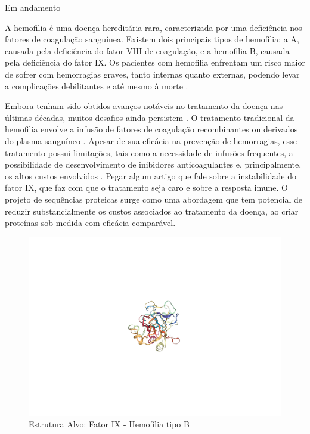 

{\color{red} Em andamento}


\label{cap:introducao}
\enlargethispage{.5\baselineskip}
A hemofilia é uma doença hereditária rara, caracterizada por uma deficiência nos fatores de coagulação sanguínea. Existem dois principais tipos de hemofilia: a A, causada pela deficiência do fator VIII de coagulação, e a hemofilia B, causada pela deficiência do fator IX. 
Os pacientes com hemofilia enfrentam um risco maior de sofrer com hemorragias graves, tanto internas quanto externas, 
podendo levar a complicações debilitantes e até mesmo à morte \cite{Mannucci}.

Embora tenham sido obtidos avanços notáveis no tratamento da doença nas últimas décadas, muitos desafios ainda persistem \cite{Gouw}. 
O tratamento tradicional da hemofilia envolve a infusão de fatores de coagulação recombinantes ou derivados do plasma sanguíneo \cite{Gouw}. Apesar de sua eficácia na prevenção de hemorragias, esse tratamento possui limitações, tais como a necessidade de infusões frequentes, a possibilidade de desenvolvimento de inibidores anticoagulantes e, principalmente, os altos custos envolvidos \cite{Mancuso}. 
{\color{red} Pegar algum artigo que fale sobre a instabilidade do fator IX, que faz com que o tratamento seja caro e sobre a resposta imune.}
O projeto de sequências proteicas surge como uma abordagem que tem potencial de reduzir substancialmente os custos associados ao tratamento da doença, ao criar proteínas sob medida com eficácia comparável.

\begin{figure}[H]
  \centering
  \includegraphics[width=.8\textwidth]{figuras/target_structure.pdf}
  \caption{Estrutura Alvo: Fator IX - Hemofilia tipo B}
\end{figure}



